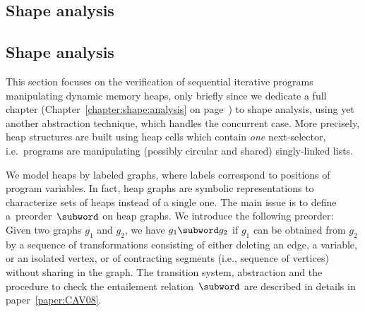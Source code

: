 \makeatletter
\if@UU@margnum
\subsection*{Shape analysis}
\else
\subsection{Shape analysis}
\fi
\makeatother

This section focuses on the verification of sequential iterative
programs manipulating dynamic memory heaps, only briefly since we
dedicate a full chapter (Chapter~\ref{chapter:shape:analysis} on
page~\pageref{chapter:shape:analysis}) to shape analysis, using yet
another abstraction technique, which handles the concurrent case.
%
%
More precisely, heap structures are built using heap cells which
contain \emph{one} next-selector, i.e.\ programs are manipulating
(possibly circular and shared) singly-linked lists.

%
We model heaps by labeled graphs, where labels correspond to positions
of program variables.
%
In fact, heap graphs are symbolic representations to characterize sets
of heaps instead of a single one.
%
The main issue is to define a~preorder~$\subword$ on heap graphs. We
introduce the following preorder: Given two graphs $g_1$ and $g_2$, we
have $g_1 \subword g_2$ if $g_1$ can be obtained from $g_2$ by a
sequence of transformations consisting of either deleting an edge, a
variable, or an isolated vertex, or of contracting segments (i.e.,
sequence of vertices) without sharing in the graph.
%
%
%
The transition system, abstraction and the procedure to check the
entailement relation~$\subword$ are described in details in
paper~\ref{paper:CAV08}.

